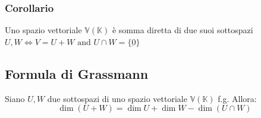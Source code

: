 \documentclass{article}
\newcommand{\V}{\mathbb{V} (\mathbb{K})}
\begin{document}
\subsubsection{Corollario}
Uno spazio vettoriale $\V$ è somma diretta di due suoi sottospazi $U, W \iff{V} = U+W \text{ and } U \cap{W} = \{\underbar{0}\}$

\subsection{Formula di Grassmann}
Siano $U, W$ due sottospazi di uno spazio vettoriale $\V$ f.g. Allora:
\[
    \dim(U+W) = \dim U + \dim W - \dim(U\cap W)
\]
\end{document}
